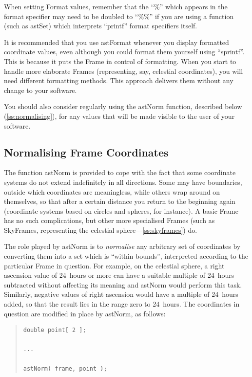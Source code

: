 \documentclass[twoside,11pt]{article}
\newcommand{\htmlref}[2]{#1}
\newcommand{\secref}[1]{\S\ref{#1}}
\renewcommand{\secref}[1]{\ref{#1}}
\begin{document}
When setting Format values, remember that the ``\%'' which appears in
the format specifier may need to be doubled to ``\%\%'' if you are
using a function (such as \htmlref{astSet}{astSet}) which interprets ``printf'' format
specifiers itself.

It is recommended that you use astFormat whenever you display
formatted coordinate values, even although you could format them
yourself using ``sprintf''. This is because it puts the Frame in
control of formatting. When you start to handle more elaborate Frames
(representing, say, celestial coordinates), you will need different
formatting methods. This approach delivers them without any change to
your software.

You should also consider regularly using the \htmlref{astNorm}{astNorm} function,
described below (\secref{ss:normalising}), for any values that will be
made visible to the user of your software.

\subsection{\label{ss:normalising}Normalising Frame Coordinates}

The function \htmlref{astNorm}{astNorm} is provided to cope with the fact that some
coordinate systems do not extend indefinitely in all directions. Some
may have boundaries, outside which coordinates are meaningless, while
others wrap around on themselves, so that after a certain distance you
return to the beginning again (coordinate systems based on circles and
spheres, for instance). A basic \htmlref{Frame}{Frame} has no such complications, but
other more specialised Frames (such as SkyFrames, representing the
celestial sphere---\secref{ss:skyframes}) do.

The role played by astNorm is to {\em{normalise}} any arbitrary set of
coordinates by converting them into a set which is ``within bounds'',
interpreted according to the particular Frame in question. For
example, on the celestial sphere, a right ascension value of 24~hours
or more can have a suitable multiple of 24~hours subtracted without
affecting its meaning and astNorm would perform this task. Similarly,
negative values of right ascension would have a multiple of 24~hours
added, so that the result lies in the range zero to 24~hours. The
coordinates in question are modified in place by astNorm, as follows:

\begin{quote}
\small
\begin{verbatim}
double point[ 2 ];

...

astNorm( frame, point );
\end{verbatim}
\normalsize
\end{quote}
\end{document}
